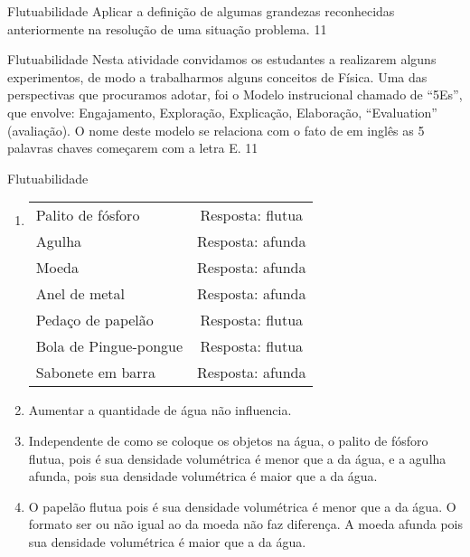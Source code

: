 \begin{objectives}{Flutuabilidade}
{
Aplicar a definição de algumas grandezas reconhecidas anteriormente na resolução de uma situação problema.
}{1}{1}
\end{objectives}
\begin{sugestions}{Flutuabilidade}
{
Nesta atividade convidamos os estudantes a realizarem alguns experimentos, de modo a trabalharmos alguns conceitos de Física.  Uma das perspectivas que procuramos adotar, foi o Modelo instrucional chamado de “5Es”, que envolve: Engajamento, Exploração, Explicação, Elaboração, “Evaluation” (avaliação). O nome deste modelo se relaciona com o fato de em inglês as 5 palavras chaves começarem com a letra E.
}{1}{1}
\end{sugestions}
\clearmargin
\begin{answer}{Flutuabilidade}
{
\begin{enumerate}
\item 
{}
{
\begin{tabular}{|e{.5\linewidth}|c|}
\hline
{} &  \\
\hline
Palito de fósforo & Resposta: flutua \\
\hline
Agulha & Resposta: afunda \\
\hline
Moeda & Resposta: afunda \\
\hline
Anel de metal & Resposta: afunda \\
\hline
Pedaço de papelão & Resposta: flutua \\
\hline
Bola de Pingue-pongue & Resposta: flutua \\
\hline
Sabonete em barra & Resposta: afunda \\
\hline
\end{tabular}
}

\item {} 
Aumentar a quantidade  de água não influencia.

\item {} 
Independente de como se coloque os objetos na água, o palito de fósforo flutua, pois é sua densidade volumétrica é menor que a da água, e a agulha afunda, pois sua densidade volumétrica é maior que a da água.

\item {} 
O papelão  flutua pois é sua densidade volumétrica é menor que a da água. O formato ser ou não igual ao da moeda não faz diferença. A moeda afunda pois sua densidade volumétrica é maior que a da água.


\end{enumerate}}
\end{answer}
